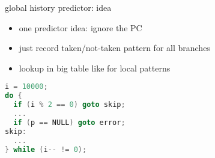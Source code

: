 \usetikzlibrary{arrows.meta,matrix}
\begin{frame}{global history predictor: idea}
\begin{itemize}
\item one predictor idea: ignore the PC
\item just record taken/not-taken pattern for all branches
\item lookup in big table like for local patterns
\end{itemize}
\end{frame}

\ifdefined\codeBox\else\newsavebox\codeBox\fi
\begin{lrbox}{\codeBox}
\begin{lstlisting}[language=C,style=smaller]
i = 10000;
do {
  if (i % 2 == 0) goto skip;
  ...
  if (p == NULL) goto error;
skip:
  ...
} while (i-- != 0);
\end{lstlisting}
\end{lrbox}


